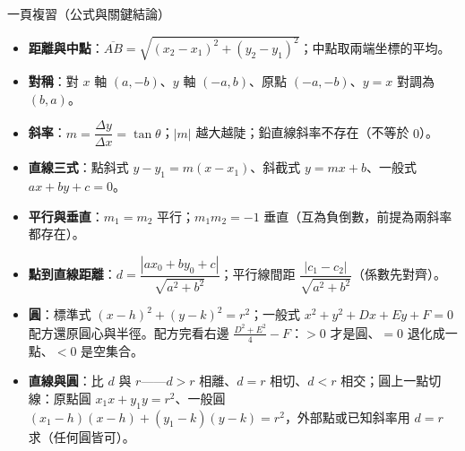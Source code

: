 \documentclass[11pt]{article}
\begin{document}
\begin{補充框}{一頁複習（公式與關鍵結論）}
\begin{itemize}\setlength{\itemsep}{2pt}
\item \textbf{距離與中點}：$\overline{AB}=\sqrt{(x_2-x_1)^2+(y_2-y_1)^2}$；中點取兩端坐標的平均。
\item \textbf{對稱}：對 $x$ 軸 $(a,-b)$、$y$ 軸 $(-a,b)$、原點 $(-a,-b)$、$y=x$ 對調為 $(b,a)$。
\item \textbf{斜率}：$m=\dfrac{\Delta y}{\Delta x}=\tan\theta$；$|m|$ 越大越陡；鉛直線斜率不存在（不等於 $0$）。
\item \textbf{直線三式}：點斜式 $y-y_1=m(x-x_1)$、斜截式 $y=mx+b$、一般式 $ax+by+c=0$。
\item \textbf{平行與垂直}：$m_1=m_2$ 平行；$m_1 m_2=-1$ 垂直（互為負倒數，前提為兩斜率都存在）。
\item \textbf{點到直線距離}：$d=\dfrac{|ax_0+by_0+c|}{\sqrt{a^2+b^2}}$；平行線間距 $\dfrac{|c_1-c_2|}{\sqrt{a^2+b^2}}$（係數先對齊）。
\item \textbf{圓}：標準式 $(x-h)^2+(y-k)^2=r^2$；一般式 $x^2+y^2+Dx+Ey+F=0$ 配方還原圓心與半徑。配方完看右邊 $\tfrac{D^2+E^2}{4}-F$：$>0$ 才是圓、$=0$ 退化成一點、$<0$ 是空集合。
\item \textbf{直線與圓}：比 $d$ 與 $r$——$d>r$ 相離、$d=r$ 相切、$d<r$ 相交；圓上一點切線：原點圓 $x_1 x+y_1 y=r^2$、一般圓 $(x_1-h)(x-h)+(y_1-k)(y-k)=r^2$，外部點或已知斜率用 $d=r$ 求（任何圓皆可）。
\end{itemize}
\end{補充框}
\end{document}
